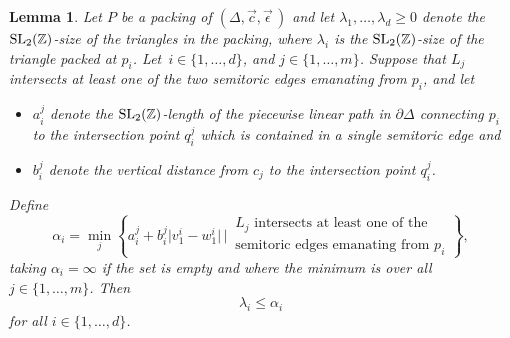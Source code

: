 \documentclass[pdftex]{sigma}
\numberwithin{equation}{section}
\newtheorem{Lemma}[Theorem]{Lemma}
\def\Z{{\mathbb Z}}
\newcommand{\De}{\Delta}
\newcommand{\SL}{{\rm SL}_2(\Z)}
\newcommand{\strep}{(\De,\vec{c},\vec{\epsilon}\,)}
\begin{document}
\begin{Lemma}\label{lem:avoid-markedpt}
Let $P$ be a packing of $\strep$ and let $\lambda_1,\ldots, \lambda_d\geq 0$ denote the $\SL$-size of the triangles in the packing, where $\lambda_i$ is the $\SL$-size of the triangle packed at $p_i$.
Let~$i\in\{1,\ldots, d\}$, and $j\in\{1,\ldots, m\}$.
Suppose that $L_j$ intersects at least one of the two semitoric edges emanating from $p_i$, and
let
 \begin{itemize}\itemsep=0pt
 \item $a_i^j$ denote the $\SL$-length of the piecewise linear path in $\partial\De$ connecting $p_i$ to the intersection point $q_i^j$ which is contained in a single semitoric edge and
 \item $b_i^j$ denote the vertical distance from $c_j$ to the intersection point $q_i^j$.
 \end{itemize}
 Define
 \begin{equation}\label{eqn:alphai}
 \alpha_i = \min_{j} \left\{a_i^j + b_i^j \big|v^i_1-w^i_1\big| \,\bigg|\, \begin{matrix}L_j \text{ intersects at least one of the}\\ \text{semitoric edges emanating from $p_i$}\end{matrix}\right\},
 \end{equation}
 taking $\alpha_i = \infty$ if the set is empty and where the minimum is over all $j\in\{1,\ldots, m\}$.
 Then
 \[
 \lambda_i \leq \alpha_i
 \]
 for all $i\in \{1,\ldots,d\}$.
\end{Lemma}
\end{document}
